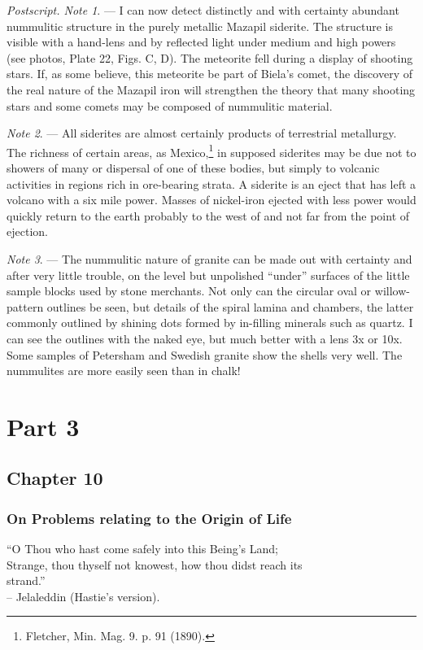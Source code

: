 \documentclass[a4paper, 12pt, oneside]{article}
\begin{document}
\emph{Postscript. Note 1}. --- I can now detect distinctly and with certainty abundant nummulitic structure in the purely metallic Mazapil siderite. The structure is visible with a hand-lens and by reflected light under medium and high powers (see photos, Plate 22, Figs. C, D). The meteorite fell during a display of shooting stars. If, as some believe, this meteorite be part of Biela's comet, the discovery of the real nature of the Mazapil iron will strengthen the theory that many shooting stars and some comets may be composed of nummulitic material.

\emph{Note 2}. --- All siderites are almost certainly products of terrestrial metallurgy. The richness of certain areas, as Mexico,\footnote{Fletcher, Min. Mag. 9. p. 91 (1890).} in supposed siderites may be due not to showers of many or dispersal of one of these bodies, but simply to volcanic activities in regions rich in ore-bearing strata. A siderite is an eject that has left a volcano with a six mile power. Masses of nickel-iron ejected with less power would quickly return to the earth probably to the west of and not far from the point of ejection.

\emph{Note 3}. --- The nummulitic nature of granite can be made out with certainty and after very little trouble, on the level but unpolished ``under'' surfaces of the little sample blocks used by stone merchants. Not only can the circular oval or willow-pattern outlines be seen, but details of the spiral lamina and chambers, the latter commonly outlined by shining dots formed by in-filling minerals such as quartz. I can see the outlines with the naked eye, but much better with a lens 3x or 10x. Some samples of Petersham and Swedish granite show the shells very well. The nummulites are more easily seen than in chalk!
\clearpage
\section{Part 3}
\subsection{Chapter 10}
\subsubsection{On Problems relating to the Origin of Life}
\begin{displayquote}
``O Thou who hast come safely into this Being's Land;\\Strange, thou thyself not knowest, how thou didst reach its\\strand.''\\-- Jelaleddin (Hastie's version).
\end{displayquote}
\end{document}
